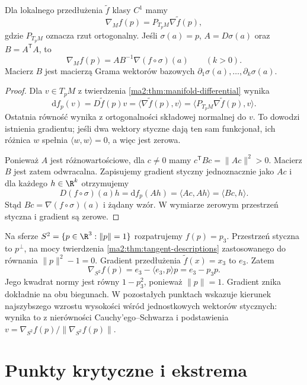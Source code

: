 \begin{stwierdzenie}
\label{ma2:prop:gradient-projection}
Dla lokalnego przedłużenia $\widetilde f$ klasy $C^1$
mamy
\[
 \nabla_M f(p)=P_{T_pM}\nabla\widetilde f(p),
\]
gdzie $P_{T_pM}$ oznacza rzut ortogonalny.
Jeśli $\sigma(a)=p$, $A=D\sigma(a)$ oraz
$B=A^{\mathsf T}A$, to
\[
 \nabla_M f(p)=A B^{-1}\nabla(f\circ\sigma)(a)
 \qquad(k>0).
\]
Macierz $B$ jest macierzą Grama wektorów bazowych
$\partial_1\sigma(a),\ldots,\partial_k\sigma(a)$.
\end{stwierdzenie}
\begin{proof}
Dla $v\in T_pM$ z twierdzenia
\ref{ma2:thm:manifold-differential} wynika
\[
 \mathrm df_p(v)=D\widetilde f(p)v
 =\langle\nabla\widetilde f(p),v\rangle
 =\langle P_{T_pM}\nabla\widetilde f(p),v\rangle.
\]
Ostatnia równość wynika z ortogonalności składowej
normalnej do $v$. To dowodzi istnienia gradientu;
jeśli dwa wektory styczne dają ten sam funkcjonał,
ich różnica $w$ spełnia $\langle w,w\rangle=0$,
a więc jest zerowa.

Ponieważ $A$ jest różnowartościowe, dla $c\ne0$
mamy $c^{\mathsf T}Bc=\|Ac\|^2>0$. Macierz $B$ jest
zatem odwracalna. Zapisujemy gradient styczny
jednoznacznie jako $Ac$ i dla każdego $h\in\R^k$
otrzymujemy
\[
 D(f\circ\sigma)(a)h
 =\mathrm df_p(Ah)=\langle Ac,Ah\rangle
 =\langle Bc,h\rangle.
\]
Stąd $Bc=\nabla(f\circ\sigma)(a)$ i żądany wzór.
W wymiarze zerowym przestrzeń styczna i gradient są
zerowe.
\end{proof}

\begin{przyklad}
\label{ma2:ex:sphere-height-gradient}
Na sferze $S^2=\{p\in\R^3:\|p\|=1\}$ rozpatrujemy
$f(p)=p_3$. Przestrzeń styczna to $p^\perp$,
na mocy twierdzenia \ref{ma2:thm:tangent-descriptions}
zastosowanego do równania $\|p\|^2-1=0$.
Gradient przedłużenia $\widetilde f(x)=x_3$ to $e_3$.
Zatem
\[
 \nabla_{S^2} f(p)=e_3-\langle e_3,p\rangle p=e_3-p_3p.
\]
Jego kwadrat normy jest równy $1-p_3^2$, ponieważ
$\|p\|=1$. Gradient znika dokładnie na obu biegunach.
W pozostałych punktach wskazuje kierunek najszybszego
wzrostu wysokości wśród jednostkowych wektorów stycznych:
wynika to z nierówności Cauchy'ego--Schwarza i podstawienia
$v=\nabla_{S^2}f(p)/\|\nabla_{S^2}f(p)\|$.
\end{przyklad}

\section{Punkty krytyczne i ekstrema}

